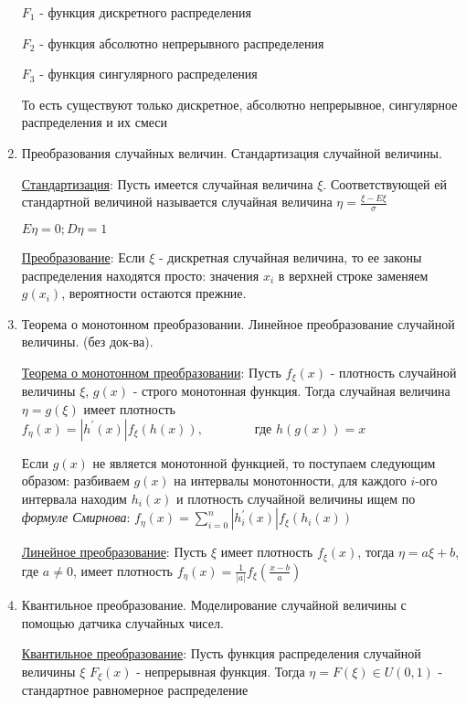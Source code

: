 \documentclass[12pt]{article}
\begin{document}
\begin{enumerate}
    $F_1$ - функция дискретного распределения

    $F_2$ - функция абсолютно непрерывного распределения

    $F_3$ - функция сингулярного распределения

    То есть существуют только дискретное, абсолютно непрерывное, сингулярное распределения и их смеси

    \item Преобразования случайных величин. Стандартизация случайной величины. 

    \hyperlink{standardizationofrandomvalue}{Стандартизация}: Пусть имеется случайная величина $\xi$. Соответствующей ей стандартной величиной называется
    случайная величина $\eta = \frac{\xi - E\xi}{\sigma}$

    $E\eta = 0; D\eta = 1$

    \hyperlink{randomvaluetransformation}{Преобразование}: Если $\xi$ - дискретная случайная величина, то ее законы распределения находятся просто: значения $x_i$ в верхней строке заменяем $g(x_i)$, вероятности остаются прежние.
    
    \item Теорема о монотонном преобразовании. Линейное преобразование случайной величины. (без док-ва).
    
    \hyperlink{monotonoustransformationtheorem}{Теорема о монотонном преобразовании}: \Ths Пусть $f_\xi(x)$ - плотность случайной величины $\xi$, $g(x)$ - строго монотонная функция. Тогда 
    случайная величина $\eta = g(\xi)$ имеет плотность $f_\eta(x) = |h^\prime(x)| f_\xi(h(x)), \qquad\qquad \text{где } h(g(x)) = x$

    Если $g(x)$ не является монотонной функцией, то поступаем следующим образом: разбиваем $g(x)$ на интервалы монотонности, 
    для каждого $i$-ого интервала находим $h_i(x)$ и плотность случайной величины ищем по \textit{формуле Смирнова}: 
    $f_\eta(x) = \sum_{i = 0}^n |h_i^\prime(x)| f_\xi(h_i(x))$
    
    \hyperlink{lineartransformation}{Линейное преобразование}: \Ths Пусть $\xi$ имеет плотность $f_\xi(x)$, тогда $\eta = a\xi + b$, где $a \neq 0$, имеет плотность $f_\eta(x) = \frac{1}{|a|}f_\xi\left(\frac{x - b}{a}\right)$
    
    \item Квантильное преобразование. Моделирование случайной величины с помощью датчика случайных чисел.

    \hyperlink{quantiletransformation}{Квантильное преобразование}: Пусть функция распределения случайной величины $\xi$ $F_\xi(x)$ - непрерывная функция. 
    Тогда $\eta = F(\xi) \in U(0, 1)$ - стандартное равномерное распределение


\end{enumerate}
\end{document}
